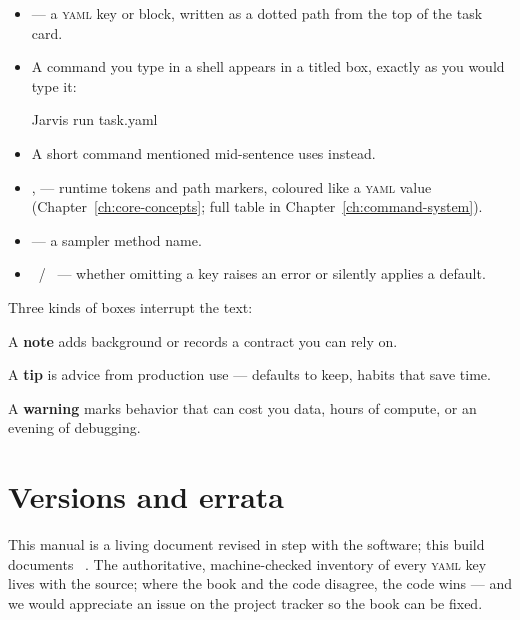 \begin{itemize}
  \item {} --- a \textsc{yaml} key or block, written as a dotted
        path from the top of the task card.
  \item A command you type in a shell appears in a titled box, exactly as you would
        type it:
\begin{terminal}
\begin{jcmd}
Jarvis run task.yaml
\end{jcmd}
\end{terminal}
  \item A short command mentioned mid-sentence uses  instead.
  \item {},  --- runtime tokens and path markers, coloured
        like a \textsc{yaml} value (Chapter~\ref{ch:core-concepts}; full table in
        Chapter~\ref{ch:command-system}).
  \item {} --- a sampler method name.
  \item \req\ / \opt\ --- whether omitting a key raises an error or silently applies a
        default.
\end{itemize}

Three kinds of boxes interrupt the text:

\begin{jnote}
A \textbf{note} adds background or records a contract you can rely on.
\end{jnote}

\begin{jtip}
A \textbf{tip} is advice from production use --- defaults to keep, habits that save time.
\end{jtip}

\begin{jwarn}
A \textbf{warning} marks behavior that can cost you data, hours of compute, or an evening
of debugging.
\end{jwarn}

\section{Versions and errata}

This manual is a living document revised in step with the software; this build documents
\Jarvis\ \Jversion. The authoritative, machine-checked inventory of every \textsc{yaml} key
lives with the source; where the book and the code disagree, the code wins --- and we would
appreciate an issue on the project tracker so the book can be fixed.
